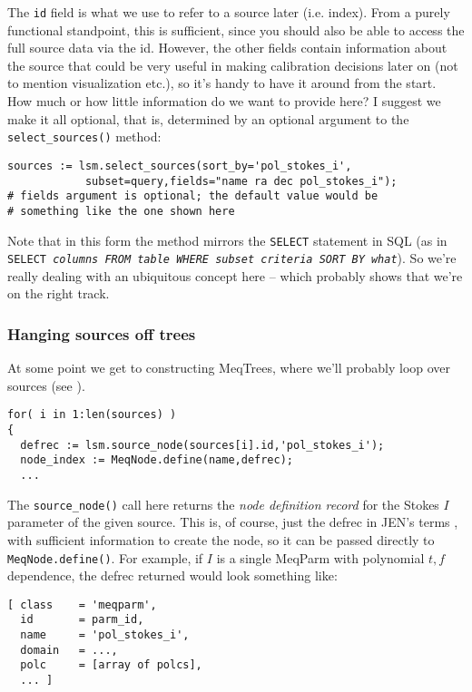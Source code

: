\documentclass[10pt]{article}
\begin{document}
The {\tt id} field is what we use to refer to a source later (i.e. index). From
a purely functional standpoint, this is sufficient, since you should also be
able to access the full source data via the id. However, the other fields
contain information about the source that could be very useful in making
calibration decisions later on (not to mention visualization etc.), so it's
handy to have it around from the start. How much or how little information do
we want to provide here? I suggest we make it all optional, that is, determined
by an optional argument to the {\tt select\_sources()} method:

\begin{verbatim}
sources := lsm.select_sources(sort_by='pol_stokes_i',
            subset=query,fields="name ra dec pol_stokes_i"); 
# fields argument is optional; the default value would be 
# something like the one shown here
\end{verbatim}

Note that in this form the method mirrors the {\tt SELECT} statement in SQL (as
in {\tt SELECT \em columns\tt\ FROM \em table\tt\  WHERE \em subset
criteria\tt\ SORT BY \em what}). So we're really dealing with an ubiquitous
concept here -- which probably shows that we're on the right track. 

\subsubsection{Hanging sources off trees}

At some point we get to constructing MeqTrees, where we'll probably loop over
sources (see \cite{PSS4}). 

\begin{verbatim}
for( i in 1:len(sources) )
{
  defrec := lsm.source_node(sources[i].id,'pol_stokes_i');
  node_index := MeqNode.define(name,defrec);
  ...
\end{verbatim}

The {\tt source\_node()} call here returns the {\em node definition record} for
the Stokes $I$ parameter of the given source. This is, of course, just the
defrec in JEN's terms \cite{PSS4}, with sufficient information to create the
node, so it can be passed directly to {\tt MeqNode.define()}. For example, if
$I$ is a single MeqParm with polynomial $t,f$ dependence, the defrec returned
would look something like:

\begin{verbatim}
[ class    = 'meqparm',
  id       = parm_id,
  name     = 'pol_stokes_i',
  domain   = ...,
  polc     = [array of polcs],
  ... ]
\end{verbatim} 
\end{document}
